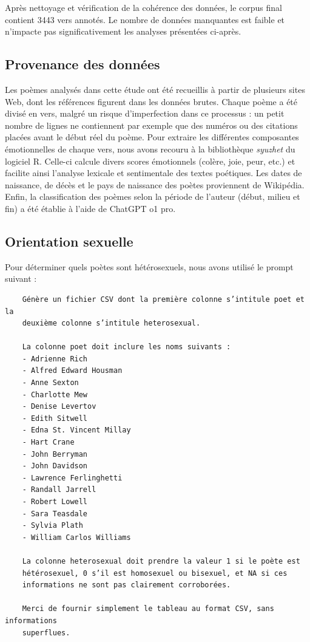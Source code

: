 \documentclass[12pt,a4paper]{article}
\begin{document}
Après nettoyage et vérification de la cohérence des données, le corpus final contient 3443
vers annotés. Le nombre de données manquantes est faible et n’impacte pas significativement
les analyses présentées ci-après.

\subsection{Provenance des données}
Les poèmes analysés dans cette étude ont été recueillis à partir de plusieurs sites Web,
dont les références figurent dans les données brutes. Chaque poème a été divisé en vers,
malgré un risque d’imperfection dans ce processus : un petit nombre de lignes
ne contiennent par exemple que des numéros ou des citations placées avant le début réel du poème.
Pour extraire les différentes composantes émotionnelles de chaque vers, nous avons
recouru à la bibliothèque \emph{syuzhet} du logiciel R. Celle-ci calcule divers scores
émotionnels (colère, joie, peur, etc.) et facilite ainsi l’analyse lexicale et sentimentale
des textes poétiques. Les dates de naissance, de décès et le pays de naissance des poètes
proviennent de Wikipédia. Enfin, la classification des poèmes selon la période de l'auteur
(début, milieu et fin) a été établie à l’aide de ChatGPT o1 pro.

\subsection{Orientation sexuelle}
Pour déterminer quels poètes sont hétérosexuels, nous avons utilisé le prompt suivant :

	\begin{verbatim}
	Génère un fichier CSV dont la première colonne s’intitule poet et la 
	deuxième colonne s’intitule heterosexual.  
	
	La colonne poet doit inclure les noms suivants :  
	- Adrienne Rich  
	- Alfred Edward Housman  
	- Anne Sexton  
	- Charlotte Mew  
	- Denise Levertov  
	- Edith Sitwell  
	- Edna St. Vincent Millay  
	- Hart Crane  
	- John Berryman  
	- John Davidson  
	- Lawrence Ferlinghetti  
	- Randall Jarrell  
	- Robert Lowell  
	- Sara Teasdale  
	- Sylvia Plath  
	- William Carlos Williams  
	
	La colonne heterosexual doit prendre la valeur 1 si le poète est 
	hétérosexuel, 0 s’il est homosexuel ou bisexuel, et NA si ces 
	informations ne sont pas clairement corroborées.  
	
	Merci de fournir simplement le tableau au format CSV, sans informations 
	superflues.
\end{verbatim}
\end{document}
